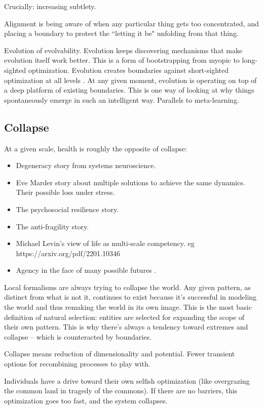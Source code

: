 Crucially: increasing subtlety.

Alignment is being aware of when any particular thing gets too concentrated, and placing a boundary to protect the ``letting it be" unfolding from that thing. 

Evolution of evolvability. Evolution keeps discovering mechanisms that make evolution itself work better. This is a form of bootstrapping from myopic to long-sighted optimization. Evolution creates boundaries against short-sighted optimization at all levels \citep{szathmary1995major, grosberg2007evolution, west2015major}. At any given moment, evolution is operating on top of a deep platform of existing boundaries. This is one way of looking at why things spontaneously emerge in such an intelligent way. Parallels to meta-learning.


\subsection{Collapse}

At a given scale, health is roughly the opposite of collapse:
\begin{itemize}
\item Degeneracy story from systems neuroscience.
\item Eve Marder story about multiple solutions to achieve the same dynamics. Their possible loss under stress.
\item The psychosocial resilience story.
\item The anti-fragility story.
\item Michael Levin's view of life as multi-scale competency. eg https://arxiv.org/pdf/2201.10346
\item Agency in the face of many possible futures \citep{shen2025beyond}. 
\end{itemize}


Local formalisms are always trying to collapse the world. Any given pattern, as distinct from what is not it, continues to exist because it's successful in modeling the world and thus remaking the world in its own image. This is the most basic definition of natural selection: entities are selected for expanding the scope of their own pattern. This is why there's always a tendency toward extremes and collapse -- which is counteracted by boundaries.

Collapse means reduction of dimensionality and potential. Fewer transient options for recombining processes to play with. 


Individuals have a drive toward their own selfish optimization (like overgrazing the common land in tragedy of the commons). If there are no barriers, this optimization goes too fast, and the system collapses. 

